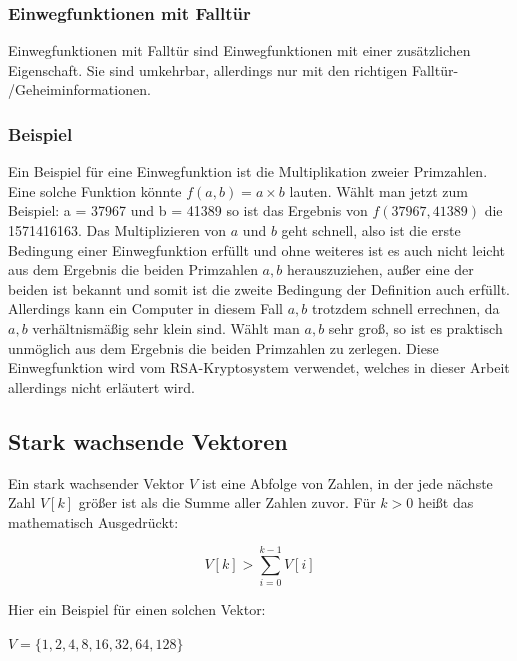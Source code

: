 \documentclass[a4paper,12pt,titlepage]{article}
\begin{document}
\subsubsection{Einwegfunktionen mit Falltür} \label{oneway_trapdoor}
Einwegfunktionen mit Falltür sind Einwegfunktionen mit einer zusätzlichen Eigenschaft. Sie sind umkehrbar, allerdings nur mit den richtigen Falltür- /Geheiminformationen.

\subsubsection{Beispiel}
Ein Beispiel für eine Einwegfunktion ist die Multiplikation zweier Primzahlen.
Eine solche Funktion könnte $f(a,b) = a \times b$ lauten. \newline Wählt man jetzt zum Beispiel: a = 37967 und b = 41389 so ist das Ergebnis von $f(37967, 41389)$ die 1571416163. Das Multiplizieren von $a$ und $b$ geht schnell, also ist die erste Bedingung einer Einwegfunktion erfüllt und ohne weiteres ist es auch nicht leicht aus dem Ergebnis die beiden Primzahlen $a,b$ herauszuziehen, außer eine der beiden ist bekannt und somit ist die zweite Bedingung der Definition auch erfüllt. Allerdings kann ein Computer in diesem Fall $a,b$ trotzdem schnell errechnen, da $a,b$ verhältnismäßig sehr klein sind. Wählt man $a,b$ sehr groß, so ist es praktisch unmöglich aus dem Ergebnis die beiden Primzahlen zu zerlegen. Diese Einwegfunktion wird vom RSA-Kryptosystem verwendet, welches in dieser Arbeit allerdings nicht erläutert wird.

\subsection{Stark wachsende Vektoren}
Ein stark wachsender Vektor $V$ ist eine Abfolge von Zahlen, in der jede nächste Zahl $V[k]$ größer ist als die Summe aller Zahlen zuvor. Für $k > 0$ heißt das mathematisch Ausgedrückt:

\begin{center}
\[V[k] > \sum_{i = 0}^{k - 1}V[i]\]
\end{center}
Hier ein Beispiel für einen solchen Vektor:
\begin{center}
$V = \{1, 2, 4, 8, 16, 32, 64, 128\}$
\end{center}
\end{document}
